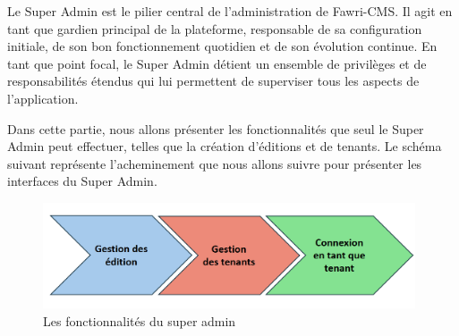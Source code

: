 \hspace{\parindent}Le Super Admin est le pilier central de l'administration de Fawri-CMS. Il agit en tant que gardien principal de la plateforme, responsable de sa configuration initiale, de son bon fonctionnement quotidien et de son évolution continue. En tant que point focal, le Super Admin détient un ensemble de privilèges et de responsabilités étendus qui lui permettent de superviser tous les aspects de l'application.

Dans cette partie, nous allons présenter les fonctionnalités que seul le Super Admin peut effectuer, telles que la création d'éditions et de tenants. Le schéma suivant représente l'acheminement que nous allons suivre pour présenter les interfaces du Super Admin.

\begin{figure}[H] 
    \centering
    \includegraphics[width=11cm]{Figures/fonctionnalite super admin.PNG}
    \caption{Les fonctionnalités du super admin}
\end{figure}

